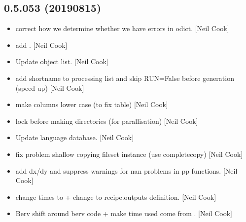 \documentclass[a4paper,10pt,english]{report}
\begin{document}
\subsection{0.5.053 (2019\sphinxhyphen{}08\sphinxhyphen{}15)}
\label{\detokenize{misc/changelog:id109}}\begin{itemize}
\item {} 
 \sphinxhyphen{} correct how we determine whether
we have errors in odict. {[}Neil Cook{]}

\item {} 
 \sphinxhyphen{} add . {[}Neil Cook{]}

\item {} 
Update object list. {[}Neil Cook{]}

\item {} 
 \sphinxhyphen{} add shortname to processing list
and skip RUN=False before generation (speed up) {[}Neil Cook{]}

\item {} 
 \sphinxhyphen{} make columns lower case (to fix table) {[}Neil
Cook{]}

\item {} 
 \sphinxhyphen{} lock before making directories (for
parallisation) {[}Neil Cook{]}

\item {} 
Update language database. {[}Neil Cook{]}

\item {} 
 \sphinxhyphen{} fix problem shallow copying
fileset instance (use completecopy) {[}Neil Cook{]}

\item {} 
 \sphinxhyphen{} add dx/dy and suppress warnings
for nan problems in pp functions. {[}Neil Cook{]}

\item {} 
 \sphinxhyphen{} change times to  + change  to
recipe.outputs definition. {[}Neil Cook{]}

\item {} 
Berv \sphinxhyphen{} shift around berv code + make time used come from .
{[}Neil Cook{]}


\end{itemize}
\end{document}
